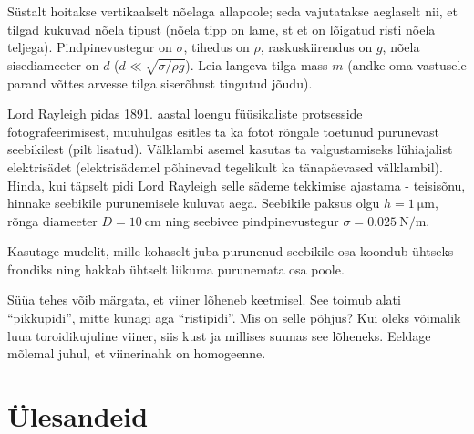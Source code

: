 \documentclass[a4paper,11pt,twocolumn]{article}
\begin{document}
\begin{question}
	Süstalt hoitakse vertikaalselt nõelaga allapoole; seda vajutatakse aeglaselt nii, et tilgad kukuvad nõela tipust (nõela tipp on lame, st et on lõigatud risti nõela teljega). Pindpinevustegur on \( \sigma \), tihedus on \( \rho \), raskuskiirendus on \( g \), nõela sisediameeter on \( d \) (\( d \ll \sqrt{\sigma/\rho g} \)). Leia langeva tilga mass \( m \) (andke oma vastusele parand võttes arvesse tilga siserõhust tingutud jõudu).
\end{question}

\begin{question}[E-S 2009, P6][ter5][4cm]
	Lord Rayleigh pidas 1891. aastal loengu füüsikaliste protsesside fotografeerimisest, muuhulgas esitles ta ka fotot rõngale toetunud purunevast seebikilest (pilt lisatud). Välklambi asemel kasutas ta valgustamiseks lühiajalist elektrisädet (elektrisädemel põhinevad tegelikult ka tänapäevased välklambil). Hinda, kui täpselt pidi Lord Rayleigh selle sädeme tekkimise ajastama - teisisõnu, hinnake seebikile purunemisele kuluvat aega. Seebikile paksus olgu \( h = \SI{1}{\micro\m} \), rõnga diameeter \( D = \SI{10}{\cm} \) ning seebivee pindpinevustegur \( \sigma = \SI{0.025}{\N\per\m} \).\\
	\begin{hint}
		Kasutage mudelit, mille kohaselt juba purunenud seebikile osa koondub ühtseks frondiks ning hakkab ühtselt liikuma purunemata osa poole.
	\end{hint}
\end{question}

\begin{question}[200MPPP, P67][ter6][\columnwidth]
	Süüa tehes võib märgata, et viiner lõheneb keetmisel. See toimub alati \enquote{pikkupidi}, mitte kunagi aga \enquote{ristipidi}. Mis on selle põhjus? Kui oleks võimalik luua toroidikujuline viiner, siis kust ja millises suunas see lõheneks. Eeldage mõlemal juhul, et viinerinahk on homogeenne.
\end{question}

\section{Ülesandeid}
\end{document}
